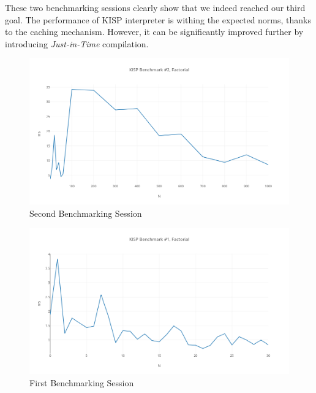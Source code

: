 These two benchmarking sessions clearly show that we indeed reached our third goal. The performance of KISP interpreter is withing
the expected norms, thanks to the caching mechanism. However, it can be significantly improved further by introducing
\textit{Just-in-Time} compilation.
\begin{figure}[h!]
    \centering
    \includegraphics[width=\linewidth]{figs/kisp-bench2.png}
    \caption{Second Benchmarking Session}
    \label{fig:bench2}
\end{figure}
\begin{figure}[h!]
    \centering
    \includegraphics[width=\linewidth]{figs/kisp-bench1.png}
    \caption{First Benchmarking Session}
    \label{fig:bench1}
\end{figure}
